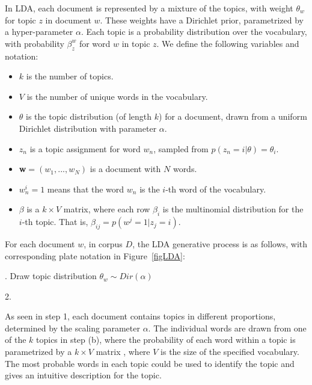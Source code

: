 \documentclass[12pt]{report}
\begin{document}
In LDA, each document is represented by a mixture of the topics, with
weight $\theta_w$ for topic
$z$ in document $w$. These weights have a Dirichlet
prior, parametrized by a hyper-parameter $\alpha$. Each topic is a
probability distribution over the vocabulary, with probability
$\beta^w_z$ for word $w$ in topic $z$. We define the following
variables and notation:
\begin{itemize}
  \item[] $k$ is the number of topics.
  \item[] $V$ is the number of unique words in the vocabulary.
  \item[] $\theta$  is the topic distribution (of length $k$) for a document,
   drawn from a uniform Dirichlet distribution with parameter $\alpha$.
 \item[] $z_{n}$ is a topic assignment for word $w_{n}$, 
 sampled from $p(z_{n} = i|\theta) = \theta_{i}$.
  \item[] \textbf{w}$ = (w_{1}, ... , w_{N})$ is a document with $N$ words.
  \item[] $w_{n}^{i} = 1$ means that the word $w_{n}$ is the $i$-th word 
  of the vocabulary.
  \item[] $\beta$  is a $k \times V$ matrix, where each row $\beta_{i}$ 
  is the multinomial distribution for the $i$-th topic. That is, 
  $\beta_{ij} = p(w^{j} = 1 | z_{j} = i)$.
\end{itemize}

For each document $w$, in corpus $D$, the LDA generative process is as follows, 
with corresponding plate notation in Figure~\ref{figLDA}:

\begin{algorithm}[H]
. Draw topic distribution $\theta_w \sim Dir(\alpha)$

2. 
\end{algorithm}

As seen in step 1, each document contains topics in different proportions,
determined by the scaling parameter $\alpha$. The individual words are drawn
from one of the $k$ topics in step (b), where the probability of each word
within a topic is parametrized by a $k \times V$ matrix , where $V$ is the
size of the specified vocabulary. The most probable words in each topic could
be used to identify the topic and gives an intuitive description for the topic.
\end{document}
